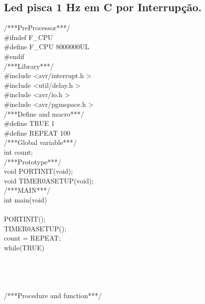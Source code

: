 \documentclass[titlepage, a4paper, 10pt, reqno, openany]{report}
\begin{document}

\subsection {Led pisca 1 Hz em C por Interrup\c{c}\~{a}o.}
\begin{minipage}[T]{.3\linewidth}
/***PreProcessor***/ \\
\#ifndef F\_CPU \\
\hspace*{1cm} \#define F\_CPU 8000000UL \\
\#endif \\
/***Library***/ \\
\#include \textless avr/interrupt.h \textgreater \\
\#include \textless util/delay.h \textgreater \\
\#include \textless avr/io.h \textgreater \\
\#include \textless avr/pgmspace.h \textgreater \\
/***Define and macro***/ \\
\#define TRUE 1 \\
\#define REPEAT 100 \\
/***Global variable***/ \\
int count; \\
/***Prototype***/ \\
void PORTINIT(void); \\
void TIMER0ASETUP(void); \\
/***MAIN***/ \\
int main(void) \\
\textbraceleft \\
\hspace*{.5cm}	PORTINIT(); \\
\hspace*{.5cm}	TIMER0ASETUP(); \\
\hspace*{.5cm}	count = REPEAT; \\
\hspace*{.5cm}	while(TRUE) \\
\hspace*{.5cm}	\textbraceleft \\
\hspace*{1cm}   \\
\hspace*{.5cm}	\textbraceright \\
\textbraceright \\
/***Procedure and function***/ \\

\end{minipage}
\end{document}
